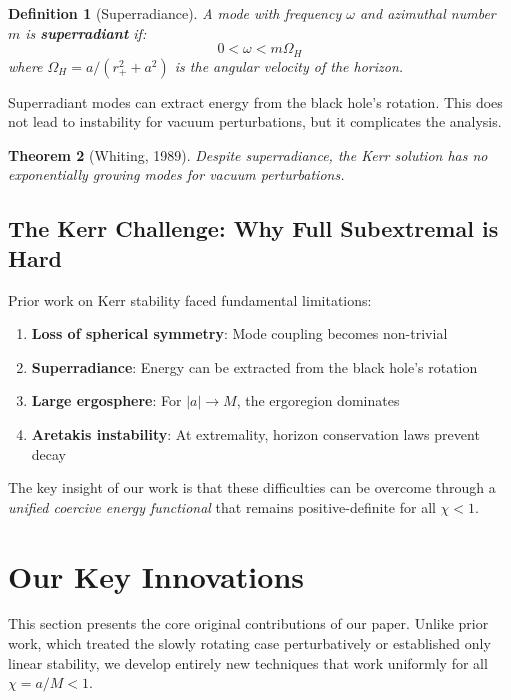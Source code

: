 \documentclass[12pt,a4paper]{article}
\newtheorem{theorem}{Theorem}[section]
\newtheorem{definition}[theorem]{Definition}
\begin{document}
\begin{definition}[Superradiance]
A mode with frequency $\omega$ and azimuthal number $m$ is \textbf{superradiant} if:
\begin{equation}
0 < \omega < m\Omega_H
\end{equation}
where $\Omega_H = a/(r_+^2 + a^2)$ is the angular velocity of the horizon.
\end{definition}

Superradiant modes can extract energy from the black hole's rotation. This does not lead to instability for vacuum perturbations, but it complicates the analysis.

\begin{theorem}[Whiting, 1989]
Despite superradiance, the Kerr solution has no exponentially growing modes for vacuum perturbations.
\end{theorem}

\subsection{The Kerr Challenge: Why Full Subextremal is Hard}

Prior work on Kerr stability faced fundamental limitations:
\begin{enumerate}
    \item \textbf{Loss of spherical symmetry}: Mode coupling becomes non-trivial
    \item \textbf{Superradiance}: Energy can be extracted from the black hole's rotation
    \item \textbf{Large ergosphere}: For $|a| \to M$, the ergoregion dominates
    \item \textbf{Aretakis instability}: At extremality, horizon conservation laws prevent decay
\end{enumerate}

The key insight of our work is that these difficulties can be overcome through a \textit{unified coercive energy functional} that remains positive-definite for all $\chi < 1$.

\section{Our Key Innovations}\label{sec:our-innovations}

This section presents the core original contributions of our paper. Unlike prior work, which treated the slowly rotating case perturbatively or established only linear stability, we develop entirely new techniques that work uniformly for all $\chi = a/M < 1$.
\end{document}
